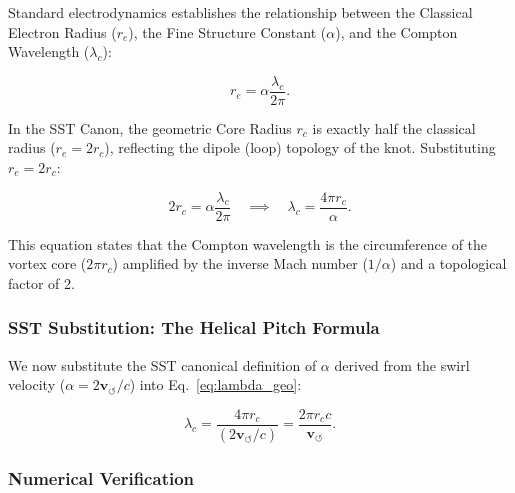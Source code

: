 \documentclass[10pt,reprint,aps,onecolumn,nofootinbib]{revtex4-2}
\begin{document}
        Standard electrodynamics establishes the relationship between the
        Classical Electron Radius ($r_e$), the Fine Structure Constant ($\alpha$),
        and the Compton Wavelength ($\lambda_c$):

        \begin{equation}
            r_e = \alpha \frac{\lambda_c}{2\pi}.
        \end{equation}

        In the SST Canon, the geometric Core Radius $r_c$ is exactly half the
        classical radius ($r_e = 2r_c$), reflecting the dipole (loop) topology
        of the knot. Substituting $r_e = 2r_c$:

        \begin{equation}
            2r_c = \alpha \frac{\lambda_c}{2\pi} \quad \implies \quad
            \lambda_c = \frac{4\pi r_c}{\alpha}.
            \label{eq:lambda_geo}
        \end{equation}

        This equation states that the Compton wavelength is the circumference of
        the vortex core ($2\pi r_c$) amplified by the inverse Mach number ($1/\alpha$)
        and a topological factor of 2.

    \subsubsection*{SST Substitution: The Helical Pitch Formula}

        We now substitute the SST canonical definition of $\alpha$ derived from
        the swirl velocity ($\alpha = 2 \mathbf{v}_{\!\boldsymbol{\circlearrowleft}} / c$) into Eq.~\eqref{eq:lambda_geo}:

        \begin{equation}
            \lambda_c = \frac{4\pi r_c}{(2 \mathbf{v}_{\!\boldsymbol{\circlearrowleft}} / c)}
            = \frac{2\pi r_c c}{\mathbf{v}_{\!\boldsymbol{\circlearrowleft}}}.
            \label{eq:SST_Compton}
        \end{equation}

    \subsubsection*{Numerical Verification}
\end{document}

